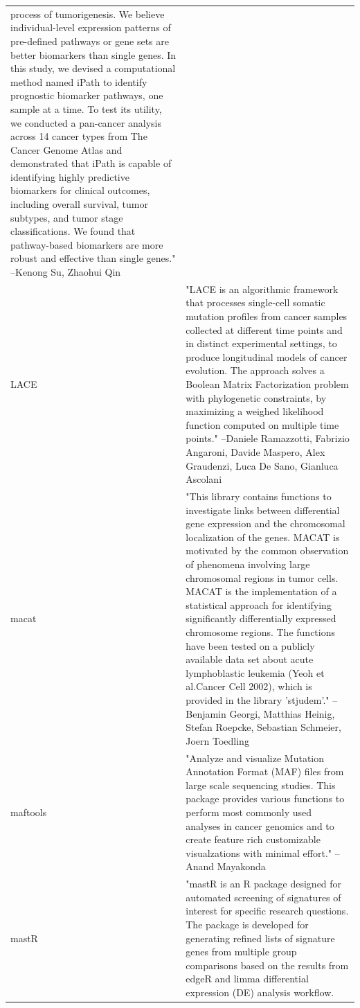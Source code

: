 \begin{longtable}[t]{l>{\raggedright\arraybackslash}p{25em}}
process of tumorigenesis. We believe individual-level
expression patterns of pre-defined pathways or gene sets are
better biomarkers than single genes. In this study, we devised
a computational method named iPath to identify prognostic
biomarker pathways, one sample at a time. To test its utility,
we conducted a pan-cancer analysis across 14 cancer types from
The Cancer Genome Atlas and demonstrated that iPath is capable
of identifying highly predictive biomarkers for clinical
outcomes, including overall survival, tumor subtypes, and tumor
stage classifications. We found that pathway-based biomarkers
are more robust and effective than single genes." --Kenong Su, Zhaohui Qin\\
\addlinespace
LACE & "LACE is an algorithmic framework that processes
single-cell somatic mutation profiles from cancer samples
collected at different time points and in distinct experimental
settings, to produce longitudinal models of cancer evolution.
The approach solves a Boolean Matrix Factorization problem with
phylogenetic constraints, by maximizing a weighed likelihood
function computed on multiple time points." --Daniele Ramazzotti, Fabrizio Angaroni, Davide Maspero, Alex Graudenzi, Luca De Sano, Gianluca Ascolani\\
macat & "This library contains functions to investigate links
between differential gene expression and the chromosomal
localization of the genes. MACAT is motivated by the common
observation of phenomena involving large chromosomal regions in
tumor cells. MACAT is the implementation of a statistical
approach for identifying significantly differentially expressed
chromosome regions. The functions have been tested on a
publicly available data set about acute lymphoblastic leukemia
(Yeoh et al.Cancer Cell 2002), which is provided in the library
'stjudem'." --Benjamin Georgi, Matthias Heinig, Stefan Roepcke, Sebastian Schmeier, Joern Toedling\\
maftools & "Analyze and visualize Mutation Annotation Format (MAF)
files from large scale sequencing studies. This package
provides various functions to perform most commonly used
analyses in cancer genomics and to create feature rich
customizable visualzations with minimal effort." --Anand Mayakonda\\
mastR & "mastR is an R package designed for automated screening of
signatures of interest for specific research questions. The
package is developed for generating refined lists of signature
genes from multiple group comparisons based on the results from
edgeR and limma differential expression (DE) analysis workflow.

\end{longtable}
